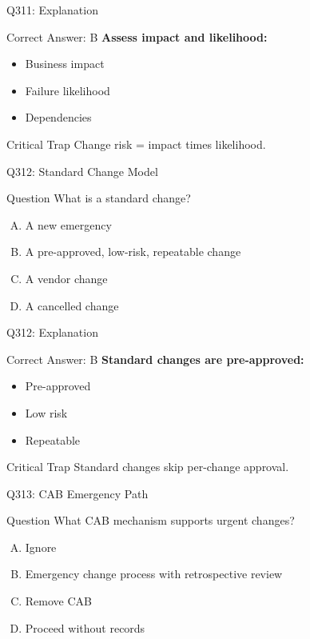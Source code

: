 \documentclass{beamer}
\begin{document}
	\begin{frame}{Q311: Explanation}
		\begin{block}{Correct Answer: B}
			\textbf{Assess impact and likelihood:}
			\begin{itemize}
				\item Business impact
				\item Failure likelihood
				\item Dependencies
			\end{itemize}
		\end{block}
		\begin{alertblock}{Critical Trap}
			Change risk = impact times likelihood.
		\end{alertblock}
	\end{frame}
	
	\begin{frame}{Q312: Standard Change Model}
		\begin{block}{Question}
			What is a standard change?
		\end{block}
		\begin{enumerate}[(A)]
			\item A new emergency
			\item A pre-approved, low-risk, repeatable change
			\item A vendor change
			\item A cancelled change
		\end{enumerate}
	\end{frame}
	
	\begin{frame}{Q312: Explanation}
		\begin{block}{Correct Answer: B}
			\textbf{Standard changes are pre-approved:}
			\begin{itemize}
				\item Pre-approved
				\item Low risk
				\item Repeatable
			\end{itemize}
		\end{block}
		\begin{alertblock}{Critical Trap}
			Standard changes skip per-change approval.
		\end{alertblock}
	\end{frame}
	
	\begin{frame}{Q313: CAB Emergency Path}
		\begin{block}{Question}
			What CAB mechanism supports urgent changes?
		\end{block}
		\begin{enumerate}[(A)]
			\item Ignore
			\item Emergency change process with retrospective review
			\item Remove CAB
			\item Proceed without records
		\end{enumerate}
	\end{frame}
	
\end{document}
